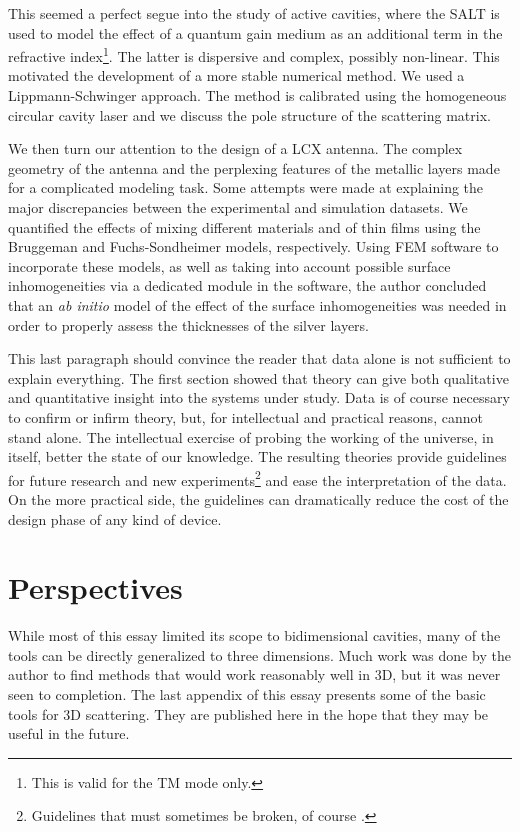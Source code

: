 This seemed a perfect segue into the study of active cavities, where
the SALT is used to model the effect of a quantum gain medium as
an additional term in the refractive index\footnote{This is valid for the TM
mode only.}. The latter is dispersive and complex, possibly non-linear.
This motivated the development of a more stable numerical method. 
We used a Lippmann-Schwinger approach. The method is calibrated using
the homogeneous circular cavity laser and we discuss the pole structure
of the scattering matrix.

We then turn our attention to the design of a LCX antenna. The complex
geometry of the antenna and the perplexing features of the metallic
layers made for a complicated modeling task. Some attempts were made
at explaining the major discrepancies between the experimental
and simulation datasets. We quantified the effects of mixing
different materials and of thin films using the Bruggeman
and Fuchs-Sondheimer models, respectively. Using FEM software
to incorporate these models, as well as taking into account
possible surface inhomogeneities via a dedicated module in the
software, the author concluded that an \textit{ab initio}
model of the effect of the surface inhomogeneities was needed
in order to properly assess the thicknesses of the silver layers.

This last paragraph should convince the reader that data alone is 
not sufficient to explain everything. The first section showed that
theory can give both qualitative and quantitative insight into
the systems under study. Data is of course necessary to confirm 
or infirm theory, but, for intellectual and practical reasons, cannot
stand alone. The intellectual exercise of probing the working of the 
universe, in itself, better the state of our knowledge. The resulting
theories provide guidelines for future research and new experiments\footnote{
Guidelines that must sometimes be broken, of course \cite{KUH1996}.}
and ease the interpretation of the data. On the more practical side, the 
guidelines can dramatically reduce the cost of the design phase of 
any kind of device. 

\section{Perspectives}
While most of this essay limited its scope to bidimensional cavities, 
many of the tools can be directly generalized to three dimensions. Much
work was done by the author to find methods that would work reasonably
well in 3D, but it was never seen to completion. The last appendix of this
essay presents some of the basic tools for 3D scattering. They are published
here in the hope that they may be useful in the future. 

